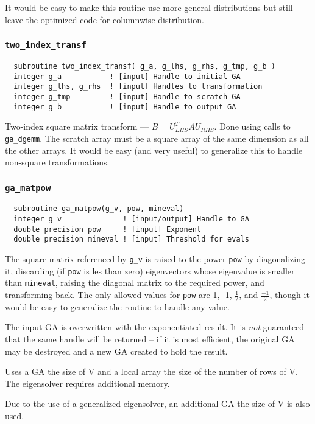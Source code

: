 It would be easy to make this routine use more general distributions
but still leave the optimized code for columnwise distribution.

\subsubsection{{\tt two\_index\_transf}}
\begin{verbatim}
  subroutine two_index_transf( g_a, g_lhs, g_rhs, g_tmp, g_b )
  integer g_a           ! [input] Handle to initial GA
  integer g_lhs, g_rhs  ! [input] Handles to transformation
  integer g_tmp         ! [input] Handle to scratch GA
  integer g_b           ! [input] Handle to output GA
\end{verbatim}
Two-index square matrix transform --- $B = U_{LHS}^T A U_{RHS}$.  Done
using calls to \verb+ga_dgemm+.  The scratch array must be a square
array of the same dimension as all the other arrays.  It would be easy
(and very useful) to generalize this to handle non-square transformations.

\subsubsection{{\tt ga\_matpow}}
\begin{verbatim}
  subroutine ga_matpow(g_v, pow, mineval)
  integer g_v              ! [input/output] Handle to GA
  double precision pow     ! [input] Exponent
  double precision mineval ! [input] Threshold for evals
\end{verbatim}
The square matrix referenced by \verb+g_v+ is raised to the power
\verb+pow+ by diagonalizing it, discarding (if \verb+pow+ is les than
zero) eigenvectors whose eigenvalue is smaller than \verb+mineval+,
raising the diagonal matrix to the required power, and transforming
back.  The only allowed values for \verb+pow+ are 1, -1,
$\frac{1}{2}$, and $\frac{-1}{2}$, though it would be easy to
generalize the routine to handle any value.

The input GA is overwritten with the exponentiated result.  It is {\em
not} guaranteed that the same handle will be returned -- if it is most
efficient, the original GA may be destroyed and a new GA created to
hold the result.

Uses a GA the size of V and a local array the size of the number
of rows of V.  The eigensolver requires additional memory.

Due to the use of a generalized eigensolver, an additional GA the size
of V is also used.

